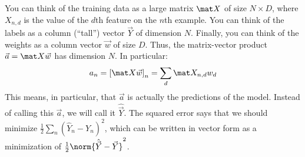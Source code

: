 You can think of the training data as a large matrix $\mat X$ of size
$N \times D$, where $X_{n,d}$ is the value of the $d$th feature on the
$n$th example.  You can think of the labels as a column (``tall'')
vector $\vec Y$ of dimension $N$.  Finally, you can think of the
weights as a column vector $\vec w$ of size $D$.  Thus, the
matrix-vector product $\vec a = \mat X \vec w$ has dimension $N$.  In
particular:
%
\begin{equation}
a_n
= \left[ \mat X \vec w \right]_n 
= \sum_d \mat X_{n,d} w_d
\end{equation}
%
This means, in particular, that $\vec a$ is actually the predictions
of the model.  Instead of calling this $\vec a$, we will call it
$\hat{\vec Y}$.  The squared error says that we should minimize $\frac 1
2 \sum_n (\hat Y_n - Y_n)^2$, which can be written in vector form as a
minimization of $\frac 1 2 \norm{\hat{\vec Y} - \vec Y}^2$.


